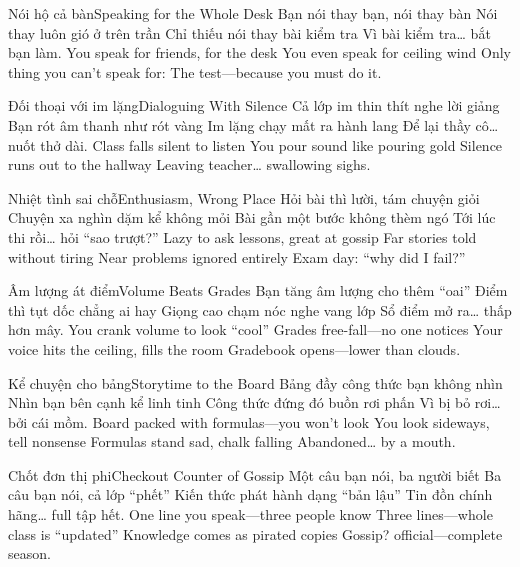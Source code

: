 \begin{tutuyetbox}{Nói hộ cả bàn}{Speaking for the Whole Desk}
Bạn nói thay bạn, nói thay bàn
Nói thay luôn gió ở trên trần
Chỉ thiếu nói thay bài kiểm tra
Vì bài kiểm tra… bắt bạn làm.
\tcblower
You speak for friends, for the desk
You even speak for ceiling wind
Only thing you can’t speak for:
The test—because you must do it.
\end{tutuyetbox}

\begin{tutuyetbox}{Đối thoại với im lặng}{Dialoguing With Silence}
Cả lớp im thin thít nghe lời giảng
Bạn rót âm thanh như rót vàng
Im lặng chạy mất ra hành lang
Để lại thầy cô… nuốt thở dài.
\tcblower
Class falls silent to listen
You pour sound like pouring gold
Silence runs out to the hallway
Leaving teacher… swallowing sighs.
\end{tutuyetbox}

\begin{tutuyetbox}{Nhiệt tình sai chỗ}{Enthusiasm, Wrong Place}
Hỏi bài thì lười, tám chuyện giỏi
Chuyện xa nghìn dặm kể không mỏi
Bài gần một bước không thèm ngó
Tới lúc thi rồi… hỏi “sao trượt?”
\tcblower
Lazy to ask lessons, great at gossip
Far stories told without tiring
Near problems ignored entirely
Exam day: “why did I fail?”
\end{tutuyetbox}

\begin{tutuyetbox}{Âm lượng át điểm}{Volume Beats Grades}
Bạn tăng âm lượng cho thêm “oai”
Điểm thì tụt dốc chẳng ai hay
Giọng cao chạm nóc nghe vang lớp
Sổ điểm mở ra… thấp hơn mây.
\tcblower
You crank volume to look “cool”
Grades free-fall—no one notices
Your voice hits the ceiling, fills the room
Gradebook opens—lower than clouds.
\end{tutuyetbox}

\begin{tutuyetbox}{Kể chuyện cho bảng}{Storytime to the Board}
Bảng đầy công thức bạn không nhìn
Nhìn bạn bên cạnh kể linh tinh
Công thức đứng đó buồn rơi phấn
Vì bị bỏ rơi… bởi cái mồm.
\tcblower
Board packed with formulas—you won’t look
You look sideways, tell nonsense
Formulas stand sad, chalk falling
Abandoned… by a mouth.
\end{tutuyetbox}

\begin{tutuyetbox}{Chốt đơn thị phi}{Checkout Counter of Gossip}
Một câu bạn nói, ba người biết
Ba câu bạn nói, cả lớp “phết”
Kiến thức phát hành dạng “bản lậu”
Tin đồn chính hãng… full tập hết.
\tcblower
One line you speak—three people know
Three lines—whole class is “updated”
Knowledge comes as pirated copies
Gossip? official—complete season.
\end{tutuyetbox}


